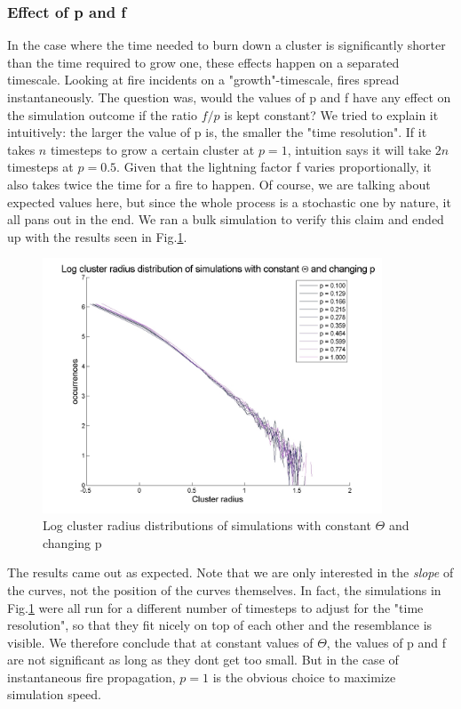 \documentclass[11pt]{article}
\begin{document}
\subsubsection{Effect of p and f}
In the case where the time needed to burn down a cluster is significantly shorter than the time required to grow one, these effects happen on a separated timescale. Looking at fire incidents on a "growth"-timescale, fires spread instantaneously. The question was, would the values of p and f have any effect on the simulation outcome if the ratio $f/p$ is kept constant? 
We tried to explain it intuitively: the larger the value of p is, the smaller the "time resolution". If it takes $n$ timesteps to grow a certain cluster at $p=1$, intuition says it will take $2n$ timesteps at $p=0.5$. Given that the lightning factor f varies proportionally, it also takes twice the time for a fire to happen. Of course, we are talking about expected values here, but since the whole process is a stochastic one by nature, it all pans out in the end. We ran a bulk simulation to verify this claim and ended up with the results seen in Fig.\ref{varpctheta}.
\begin{figure}[H]
\includegraphics[width= 0.9\textwidth,keepaspectratio=true]{Pictures/varpconsttheta.jpg}
\caption{Log cluster radius distributions of simulations with constant $\Theta$ and changing p}
\label{varpctheta}
\end{figure}
The results came out as expected. Note that we are only interested in the \emph{slope} of the curves, not the position of the curves themselves. In fact, the simulations in Fig.\ref{varpctheta} were all run for a different number of timesteps to adjust for the "time resolution", so that they fit nicely on top of each other and the resemblance is visible. We therefore conclude that at constant values of $\Theta$, the values of p and f are not significant as long as they dont get too small. But in the case of instantaneous fire propagation, $p=1$ is the obvious choice to maximize simulation speed.
\end{document}
